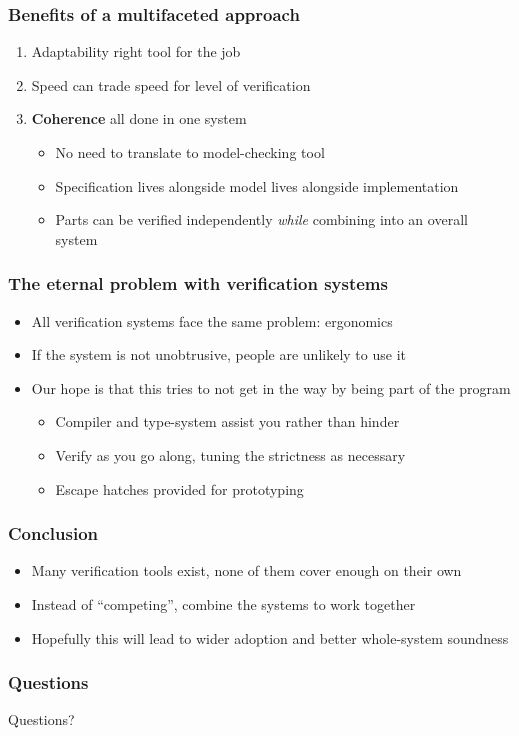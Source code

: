 \documentclass[compress]{beamer}
\begin{document}
\begin{frame}
  \frametitle{Benefits of a multifaceted approach}

  \begin{enumerate}
    \item Adaptability \textemdash right tool for the job
    \item Speed \textemdash can trade speed for level of verification
    \item \textbf{Coherence} \textemdash all done in one system
      \begin{itemize}
        \item No need to translate to model-checking tool
        \item Specification lives alongside model lives alongside
              implementation
        \item Parts can be verified independently \emph{while} combining into an
              overall system
      \end{itemize}
  \end{enumerate}

\end{frame}

\begin{frame}
  \frametitle{The eternal problem with verification systems}

  \begin{itemize}
    \item All verification systems face the same problem: ergonomics
    \item If the system is not unobtrusive, people are unlikely to use it
    \item Our hope is that this tries to not get in the way by being part of the
          program
      \begin{itemize}
        \item Compiler and type-system assist you rather than hinder
        \item Verify as you go along, tuning the strictness as necessary
        \item Escape hatches provided for prototyping
      \end{itemize}
  \end{itemize}

\end{frame}

\begin{frame}
  \frametitle{Conclusion}

  \begin{itemize}
    \item Many verification tools exist, none of them cover enough on their own
    \item Instead of ``competing'', combine the systems to work together
    \item Hopefully this will lead to wider adoption and better whole-system
          soundness
  \end{itemize}

\end{frame}

\begin{frame}
  \frametitle{Questions}

  \begin{center}
    \begin{alertblock}{Questions?}
    \end{alertblock}
  \end{center}

\end{frame}
\end{document}
